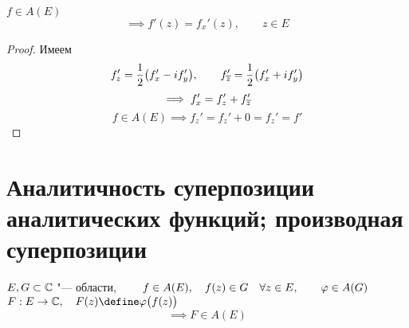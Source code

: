 \begin{implication}
	$ f \in A(E) $
	$$ \implies f'(z) = f_x'(z), \qquad z \in E $$
\end{implication}

\begin{proof}
	Имеем
	$$ f_z' = \frac12 \big( f_x' - if_y' \big), \qquad f_{\overline z}' = \frac12 \big( f_x' + if_y' \big) $$
	$$ \implies f_x' = f_z' + f_{\overline z}' $$
	$$ f \in A(E) \implies f_z' = f_z' + 0 = f_z' = f' $$
\end{proof}

\section{Аналитичность суперпозиции аналитических функций; производная суперпозиции}

\begin{theorem}
	$ E, G \subset \mathbb{C} $ "--- области, $ \qquad f \in A(E), \quad f(z) \in G \quad \forall z \in E, \qquad \varphi \in A(G) $ \\
	$ F : E \to \Co, \quad F(z) \define \vphi \big( f(z) \big) $
	$$ \implies F \in A(E) $$
\end{theorem}

